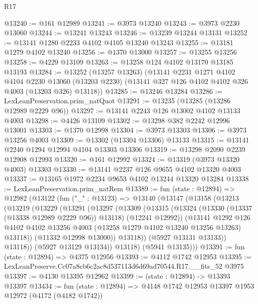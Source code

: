 \begin{lexlean}{R17}
\begin{coremodule}
@13240 := @161 @12989
@13241 := @3973 @13240
@13243 := @3973 @2230 @13060
@13244 := @13241 @13243
@13246 := @13239 @13244 @13131
@13252 := @13141 @1280 @2233 @4102 @4105 @13240 @13243
@13255 := @13181 @1279 @4102 @13240
@13256 := @1370 @13000
@13257 := @13255 @13256
@13258 := @4229 @13109
@13263 := @13258 @124 @4102 @13170 @13185 @13193
@13284 := @13252
    (@13257 @13263)
    (@13141
      @2231
      @1271
      @4102
      @4104
      @2230
      @13060
      (@13203 @2230)
      (@13141 @327 @126 @4102 @4102 @326 @4003 (@13203 @326) @13118))
@13285 := @13246 @13284
@13286 := LexLeanPreservation.prim_natQuot
@13291 := @13235 (@13285 (@13286 @12989 @2229 @96))
@13297 := @13141 @2243 @126 @13002 @4102 @13133 @4003
@13298 := @4426 @13109
@13302 := @13298 @382 @2242 @12996 @13001
@13303 := @1370 @12998
@13304 := @3973 @13303
@13306 := @3973 @13256 @4003
@13309 := @13302 (@13304 @13306) @13133
@13315 := @13141 @2240 @1294 @12994 @4104 @13303 @13306
@13319 := @13298 @2090 @2239 @12908 @12993
@13320 := @161 @12992
@13324 := @13319 (@3973 @13320 @4003) @13303
@13330 := @13141 @2237 @126 @9655 @4102 @13320 @4003
@13337 := @13165 @1972 @2234 @9653 @4102 @13244 @13320 @13284
@13338 := LexLeanPreservation.prim_natRem
@13389 := fun (state : @12894) =>
  @12982
    (@13122
      (fun ("_" : @13123) =>
      @13140
        (@13147
          (@13158
            (@13213
              (@13219
                (@13229
                  (@13291
                    (@13297
                      (@13309
                        (@13315
                          (@13324
                            (@13330 (@13337 (@13338 @12989 @2229 @96)) @13118)
                            (@12241 @12992))
                          (@13141
                            @1292
                            @126
                            @4102
                            @4102
                            @13256
                            @4003
                            (@13258 @1279 @4102 @13240 @13256 @13263)
                            @13118))
                        (@11332 @12998 @13000))
                      @13118))
                  (@5927 @13131 @13133))
                @13118))
            (@5927 @13129 @13134))
          @13118)
        (@5941 @13135)))
@13391 := fun (state : @12894) => @4375 @12956
@13393 := @4112 @1742 @12953
@13395 := LexLeanPreserve.Cc07a8cb6c2ac8d537113d6d69ad70544.R17.__fits_52 @3975
@13397 := @4130 @13395 @12962
@13399 := (state : @12894) -> @13393 @13397
@13434 := fun (state : @12894) =>
  @4148
    @1742
    @12953
    @13397
    @1953
    @12972
    (@4172 (@4182 @1742))

\end{coremodule}
\end{lexlean}
